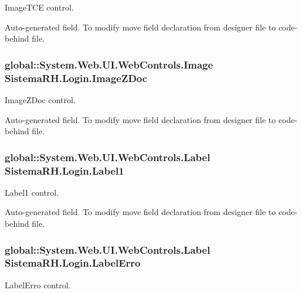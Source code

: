 ImageTCE control. 

Auto-\/generated field. To modify move field declaration from designer file to code-\/behind file. \hypertarget{class_sistema_r_h_1_1_login_a361fb9f9c0838d28e2b3a5c5e95cb08c}{
\subsubsection[{ImageZDoc}]{\setlength{\rightskip}{0pt plus 5cm}global::System.Web.UI.WebControls.Image {\bf SistemaRH.Login.ImageZDoc}}}
\label{class_sistema_r_h_1_1_login_a361fb9f9c0838d28e2b3a5c5e95cb08c}


ImageZDoc control. 

Auto-\/generated field. To modify move field declaration from designer file to code-\/behind file. \hypertarget{class_sistema_r_h_1_1_login_aeb9e2c2e0fa927b77dd6c879c4eddc66}{
\subsubsection[{Label1}]{\setlength{\rightskip}{0pt plus 5cm}global::System.Web.UI.WebControls.Label {\bf SistemaRH.Login.Label1}}}
\label{class_sistema_r_h_1_1_login_aeb9e2c2e0fa927b77dd6c879c4eddc66}


Label1 control. 

Auto-\/generated field. To modify move field declaration from designer file to code-\/behind file. \hypertarget{class_sistema_r_h_1_1_login_a7683e36c7bed32338b3c0bc779b94227}{
\subsubsection[{LabelErro}]{\setlength{\rightskip}{0pt plus 5cm}global::System.Web.UI.WebControls.Label {\bf SistemaRH.Login.LabelErro}}}
\label{class_sistema_r_h_1_1_login_a7683e36c7bed32338b3c0bc779b94227}


LabelErro control. 

